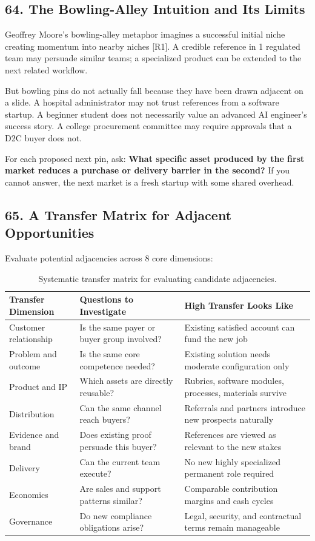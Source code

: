 \subsection*{64. The Bowling-Alley Intuition and Its Limits}

Geoffrey Moore's bowling-alley metaphor imagines a successful initial niche creating momentum into nearby niches [R1]. A credible reference in 1 regulated team may persuade similar teams; a specialized product can be extended to the next related workflow.

But bowling pins do not actually fall because they have been drawn adjacent on a slide. A hospital administrator may not trust references from a software startup. A beginner student does not necessarily value an advanced AI engineer's success story. A college procurement committee may require approvals that a D2C buyer does not.

For each proposed next pin, ask: \textbf{What specific asset produced by the first market reduces a purchase or delivery barrier in the second?} If you cannot answer, the next market is a fresh startup with some shared overhead.

\subsection*{65. A Transfer Matrix for Adjacent Opportunities}

Evaluate potential adjacencies across 8 core dimensions:

\begin{table}[t]
\centering
\small
\begin{tabularx}{\textwidth}{l p{6.5cm} X}
\toprule
\textbf{Transfer Dimension} & \textbf{Questions to Investigate} & \textbf{High Transfer Looks Like} \\
\midrule
Customer relationship & Is the same payer or buyer group involved? & Existing satisfied account can fund the new job \\
Problem and outcome & Is the same core competence needed? & Existing solution needs moderate configuration only \\
Product and IP & Which assets are directly reusable? & Rubrics, software modules, processes, materials survive \\
Distribution & Can the same channel reach buyers? & Referrals and partners introduce new prospects naturally \\
Evidence and brand & Does existing proof persuade this buyer? & References are viewed as relevant to the new stakes \\
Delivery & Can the current team execute? & No new highly specialized permanent role required \\
Economics & Are sales and support patterns similar? & Comparable contribution margins and cash cycles \\
Governance & Do new compliance obligations arise? & Legal, security, and contractual terms remain manageable \\
\bottomrule
\end{tabularx}
\caption{Systematic transfer matrix for evaluating candidate adjacencies.}
\label{tab:ch7-transfer-matrix}
\end{table}

